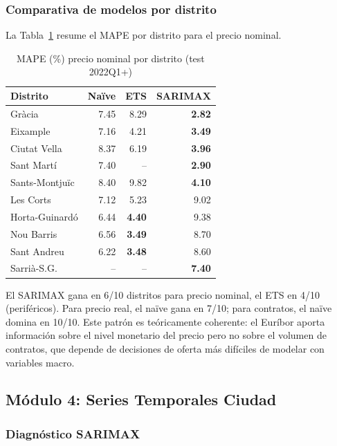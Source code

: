 \documentclass[10pt,a4paper,twocolumn]{article}
\begin{document}
\subsubsection{Comparativa de modelos por distrito}

La Tabla~\ref{tab:mape_dist} resume el MAPE por distrito para el precio nominal.

\begin{table}[H]
\caption{MAPE (\%) precio nominal por distrito (test 2022Q1+)}
\label{tab:mape_dist}
\centering\small
\begin{tabular}{lrrr}
\toprule
Distrito & Naïve & ETS & SARIMAX \\
\midrule
Gràcia          & 7.45 & 8.29 & \textbf{2.82} \\
Eixample        & 7.16 & 4.21 & \textbf{3.49} \\
Ciutat Vella    & 8.37 & 6.19 & \textbf{3.96} \\
Sant Martí      & 7.40 & -- & \textbf{2.90} \\
Sants-Montjuïc  & 8.40 & 9.82 & \textbf{4.10} \\
Les Corts       & 7.12 & 5.23 & 9.02 \\
Horta-Guinardó  & 6.44 & \textbf{4.40} & 9.38 \\
Nou Barris      & 6.56 & \textbf{3.49} & 8.70 \\
Sant Andreu     & 6.22 & \textbf{3.48} & 8.60 \\
Sarrià-S.G.     & -- & -- & \textbf{7.40} \\
\bottomrule
\end{tabular}
\end{table}

El SARIMAX gana en 6/10 distritos para precio nominal, el ETS en 4/10 (periféricos).
Para precio real, el naïve gana en 7/10; para contratos, el naïve domina en 10/10.
Este patrón es teóricamente coherente: el Euríbor aporta información sobre el nivel
monetario del precio pero no sobre el volumen de contratos, que depende de decisiones
de oferta más difíciles de modelar con variables macro.

\subsection{Módulo 4: Series Temporales Ciudad}

\subsubsection{Diagnóstico SARIMAX}
\end{document}
